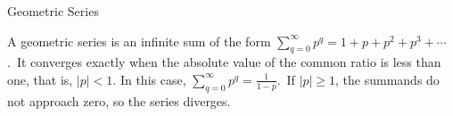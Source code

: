 \begin{leftbar}
\Huge Geometric Series
\end{leftbar}

A geometric series is an infinite sum of the form
\(\sum_{q=0}^{\infty} p^q = 1 + p + p^2 + p^3 + \cdots\).\
It converges exactly when the absolute value of the common ratio is less than one, that is, \(|p| < 1\). In this case,
\(\sum_{q=0}^{\infty} p^q = \frac{1}{1-p}\).\
If \(|p| \geq 1\), the summands do not approach zero, so the series diverges.
